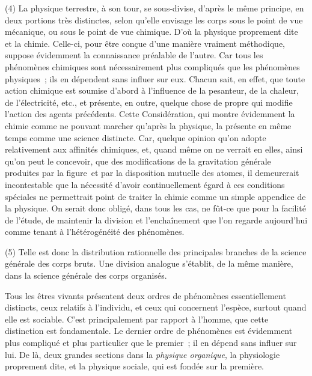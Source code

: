 \documentclass[french,twoside]{book} %
\begin{document}
(4) La physique terrestre, à son tour, se sous-divise, d’après le même principe, en deux portions très distinctes, selon qu’elle envisage les corps sous le point de vue mécanique, ou sous le point de vue chimique. D’où la physique proprement dite et la chimie. Celle-ci, pour être conçue d’une manière vraiment méthodique, suppose évidemment la connaissance préalable de l’autre. Car tous les phénomènes chimiques sont nécessairement plus compliqués que les phénomènes physiques ; ils en dépendent sans influer sur eux. Chacun sait, en effet, que toute action chimique est soumise d’abord à l’influence de la pesanteur, de la chaleur, de l’électricité, etc., et présente, en outre, quelque chose de propre qui modifie l’action des agents précédents. Cette Considération, qui montre évidemment la chimie comme ne pouvant marcher qu’après la physique, la présente en même temps comme une science distincte. Car, quelque opinion qu’on adopte relativement aux affinités chimiques, et, quand même on ne verrait en elles, ainsi qu’on peut le concevoir, que des modifications de la gravitation générale produites par la figure et par la disposition mutuelle des atomes, il demeurerait incontestable que la nécessité d’avoir continuellement égard à ces conditions spéciales ne permettrait point de traiter la chimie comme un simple appendice de la physique. On serait donc obligé, dans tous les cas, ne fût-ce que pour la facilité de l’étude, de maintenir la division et l’enchaînement que l’on regarde aujourd’hui comme tenant à l’hétérogénéité des phénomènes.\par
(5) Telle est donc la distribution rationnelle des principales branches de la science générale des corps bruts. Une division analogue s’établit, de la même manière, dans la science générale des corps organisés.\par
Tous les êtres vivants présentent deux ordres de phénomènes essentiellement distincts, ceux relatifs à l’individu, et ceux qui concernent l’espèce, surtout quand elle est sociable. C’est principalement par rapport à l’homme, que cette distinction est fondamentale. Le dernier ordre de phénomènes est évidemment plus compliqué et plus particulier que le premier ; il en dépend sans influer sur lui. De là, deux grandes sections dans la {\itshape physique organique}, la physiologie proprement dite, et la physique sociale, qui est fondée sur la première.\par
\end{document}
